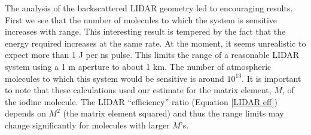 The analysis of the backscattered LIDAR geometry led to encouraging results. First we see that the number of molecules to which the system is sensitive increases with range. This interesting result is tempered by the fact that the energy required increases at the same rate. At the moment, it seems unrealistic to expect more than 1 J per ns pulse. This limits the range of a reasonable LIDAR system using a 1 m aperture to about 1 km. The number of atmospheric molecules to which this system would be sensitive is around $10^{13}$. It is important to note that these calculations used our estimate for the matrix element, $M$, of the iodine molecule. The LIDAR ``efficiency'' ratio (Equation \ref{LIDAR eff}) depends on $M^2$ (the matrix element squared) and thus the range limits may change significantly for molecules with larger $M$'s.
